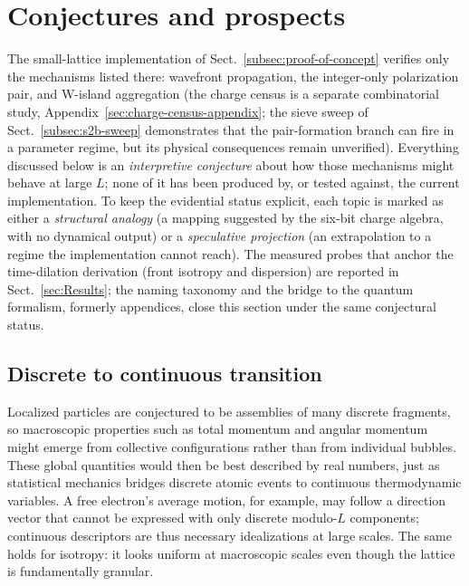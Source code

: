 \documentclass{ijuc}
\begin{document}
\section{Conjectures and prospects\label{sec:Prospects-and-conjectures}}
The small-lattice implementation of Sect.~\ref{subsec:proof-of-concept} verifies only the mechanisms listed there: wavefront propagation, the integer-only polarization pair, and W-island aggregation (the charge census is a separate combinatorial study, Appendix~\ref{sec:charge-census-appendix}; the sieve sweep of Sect.~\ref{subsec:s2b-sweep} demonstrates that the pair-formation branch can fire in a parameter regime, but its physical consequences remain unverified).  Everything discussed below is an \emph{interpretive conjecture} about how those mechanisms might behave at large $L$; none of it has been produced by, or tested against, the current implementation.  To keep the evidential status explicit, each topic is marked as either a \emph{structural analogy} (a mapping suggested by the six-bit charge algebra, with no dynamical output) or a \emph{speculative projection} (an extrapolation to a regime the implementation cannot reach).  The measured probes that anchor the time-dilation derivation (front isotropy and dispersion) are reported in Sect.~\ref{sec:Results}; the naming taxonomy and the bridge to the quantum formalism, formerly appendices, close this section under the same conjectural status.
\subsection{Discrete to continuous transition}
Localized particles are conjectured to be assemblies of many discrete fragments, so macroscopic properties such as total momentum and angular momentum might emerge from collective configurations rather than from individual bubbles. These global quantities would then be best described by real numbers, just as statistical mechanics bridges discrete atomic events to continuous thermodynamic variables.
A free electron's average motion, for example, may follow a direction vector that cannot be expressed with only discrete modulo-$L$ components; continuous descriptors are thus necessary idealizations at large scales. The same holds for isotropy: it looks uniform at macroscopic scales even though the lattice is fundamentally granular.
\end{document}

